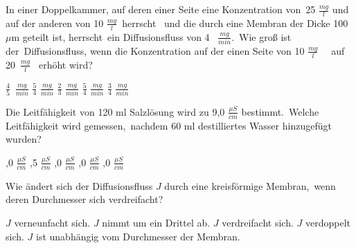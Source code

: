 \documentclass[11pt]{exam}
\begin{document}
\setlength{\voffset}{-0.5in}
\setlength{\headsep}{5pt}

\hspace{2mm}
 \hspace{5mm}
\vspace{4mm}

\begin{questions}

\question In einer Doppelkammer, auf deren einer Seite eine Konzentration von 25 \(\frac{mg}{l} \) und auf der anderen von 10 \(  \frac{mg}{l} \) herrscht  und die durch eine Membran der Dicke 100 \(\mu \)m geteilt ist, herrscht ein Diffusionsfluss von 4  \( \frac{mg}{min}\). Wie groß ist der Diffusionsfluss, wenn die Konzentration auf der einen Seite von 10 \(  \frac{mg}{l} \)   auf 20 \(  \frac{mg}{l} \)  erhöht wird?

\begin{choices}
	\choice \( \frac{4}{5} \) \( \frac{mg}{min} \)
	\choice \( \frac{5}{4} \) \( \frac{mg}{min} \)
	\choice \( \frac{2}{3} \) \( \frac{mg}{min} \)
	\choice \( \frac{5}{4} \) \( \frac{mg}{min} \)
	\choice \( \frac{3}{4} \) \( \frac{mg}{min} \)
\end{choices}

\vspace{3mm}\question Die Leitfähigkeit von 120 ml Salzlösung wird zu 9,0 \( \frac{\mu S}{cm} \) bestimmt. Welche Leitfähigkeit wird gemessen, nachdem 60 ml destilliertes Wasser hinzugefügt wurden?

\begin{choices}
	,0 \( \frac{\mu S}{cm} \)
	,5 \( \frac{\mu S}{cm} \)
	,0 \( \frac{\mu S}{cm} \)
	,0 \( \frac{\mu S}{cm} \)
	,0 \( \frac{\mu S}{cm} \)
\end{choices}

\vspace{3mm}\question Wie ändert sich der Diffusionsfluss \( J \) durch eine kreisförmige Membran, wenn deren Durchmesser sich verdreifacht?

\begin{choices}
	\choice \( J \) verneunfacht sich.
	\choice \( J \) nimmt um ein Drittel ab.
	\choice \( J \) verdreifacht sich.
	\choice \( J \) verdoppelt sich.
	\choice \( J \) ist unabhängig vom Durchmesser der Membran.
\end{choices}


\end{questions}
\end{document}
